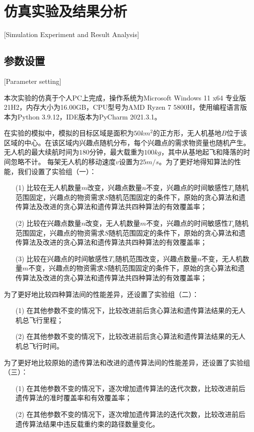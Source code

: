 
\chapter{仿真实验及结果分析}[Simulation Experiment and Result Analysis]

\section{参数设置}[Parameter setting]

本次实验的仿真于个人PC上完成，操作系统为Microsoft Windows 11 x64 专业版 21H2，内存大小为16.00GB，CPU型号为AMD Ryzen 7 5800H，使用编程语言版本为Python 3.9.12，IDE版本为PyCharm 2021.3.1。


在实验的模拟中，模拟的目标区域是面积为$50km^2$的正方形，无人机基地$B$位于该区域的中心。在该区域内兴趣点随机分布，每个兴趣点的需求物资量也随机产生。无人机的最大续航时间为$180$分钟，最大载重为$100kg$，其中从基地起飞和降落的时间忽略不计。
每架无人机的移动速度$v$设置为$25m/s$。为了更好地得知算法的性能，我们设置了实验组（一）：
\begin{itemize}
	\item [(1)] 比较在无人机数量$m$改变，兴趣点数量$n$不变，兴趣点的时间敏感性$T_s$随机范围固定，兴趣点的物资需求$S$随机范围固定的条件下，原始的贪心算法和遗传算法及改进的贪心算法和遗传算法共四种算法的有效覆盖率；
    \item [(2)] 比较在兴趣点数量$n$改变，无人机数量$m$不变，兴趣点的时间敏感性$T_s$随机范围固定，兴趣点的物资需求$S$随机范围固定的条件下，原始的贪心算法和遗传算法及改进的贪心算法和遗传算法共四种算法的有效覆盖率；
    \item [(3)] 比较在兴趣点的时间敏感性$T_s$随机范围改变，兴趣点数量$n$不变，无人机数量$m$不变，兴趣点的物资需求$S$随机范围固定的条件下，原始的贪心算法和遗传算法及改进的贪心算法和遗传算法共四种算法的有效覆盖率；
\end{itemize}


为了更好地比较四种算法间的性能差异，还设置了实验组（二）：
\begin{itemize}
	\item [(1)] 在其他参数不变的情况下，比较改进前后贪心算法和遗传算法结果的无人机总飞行里程；
    \item [(2)] 在其他参数不变的情况下，比较改进前后贪心算法和遗传算法结果的无人机总飞行时间。
\end{itemize}


为了更好地比较原始的遗传算法和改进的遗传算法间的性能差异，还设置了实验组（三）：
\begin{itemize}
	\item [(1)] 在其他参数不变的情况下，逐次增加遗传算法的迭代次数，比较改进前后遗传算法的准时覆盖率和有效覆盖率；
 	\item [(2)] 在其他参数不变的情况下，逐次增加遗传算法的迭代次数，比较改进前后遗传算法结果中违反载重约束的路径数量变化。
\end{itemize}
